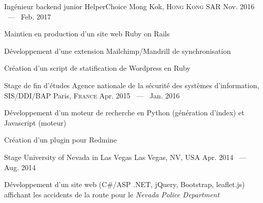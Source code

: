 

\begin{cventries}

  \cventry
    {Ingénieur backend junior} %
    {HelperChoice} %
    {Mong Kok, \textsc{Hong Kong SAR} \emojiflaghk} %
    {Nov. 2016 ~---~ Feb. 2017} %
    {
      \begin{cvitems} %
        \item {Maintien en production d'un site web Ruby on Rails}
        \item {Développement d'une extension Mailchimp/Mandrill de synchronisation}
        \item {Création d'un script de statification de Wordpress en Ruby}
      \end{cvitems}
    }

  \cventry
    {Stage de fin d'études} %
    {Agence nationale de la sécurité des systèmes d'information, SIS/DDI/BAP} %
    {Paris, \textsc{France} \emojiflagfr} %
    {Apr. 2015 ~---~ Jan. 2016} %
    {
      \begin{cvitems} %
        \item {Développement d'un moteur de recherche en Python (génération d'index) et Javascript (moteur)}
        \item {Création d'un plugin pour Redmine}
      \end{cvitems}
    }

  \cventry
    {Stage} %
    {University of Nevada in Las Vegas} %
    {Las Vegas, NV, USA \emojiflagus} %
    {Apr. 2014 ~---~ Aug. 2014} %
    {
      \begin{cvitems} %
        \item {Développement d'un site web (C\#/ASP .NET, jQuery, Bootstrap, leaflet.js) affichant les accidents de la route pour le \textit{Nevada Police Department}}
      \end{cvitems}
    }

\end{cventries}
